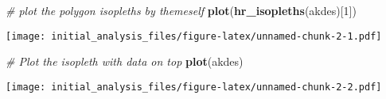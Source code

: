 \documentclass[
]{article}
\newenvironment{Shaded}{\begin{snugshade}}{\end{snugshade}}
\newcommand{\CommentTok}[1]{\textcolor[rgb]{0.56,0.35,0.01}{\textit{#1}}}
\newcommand{\DecValTok}[1]{\textcolor[rgb]{0.00,0.00,0.81}{#1}}
\newcommand{\FunctionTok}[1]{\textcolor[rgb]{0.13,0.29,0.53}{\textbf{#1}}}
\newcommand{\NormalTok}[1]{#1}
\begin{document}
\begin{Shaded}
\begin{Highlighting}[]
\CommentTok{\# plot the polygon isopleths by themeself}
\FunctionTok{plot}\NormalTok{(}\FunctionTok{hr\_isopleths}\NormalTok{(akdes)[}\DecValTok{1}\NormalTok{])}
\end{Highlighting}
\end{Shaded}

\texttt{[image: initial\_analysis\_files/figure-latex/unnamed-chunk-2-1.pdf]}

\begin{Shaded}
\begin{Highlighting}[]
\CommentTok{\# Plot the isopleth with data on top}
\FunctionTok{plot}\NormalTok{(akdes) }
\end{Highlighting}
\end{Shaded}

\texttt{[image: initial\_analysis\_files/figure-latex/unnamed-chunk-2-2.pdf]}
\end{document}
